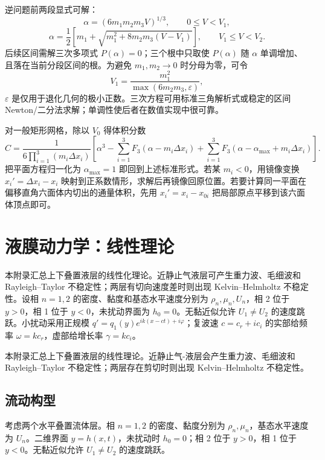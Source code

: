 \documentclass[11pt,a4paper,openany,fontset=none]{ctexbook}
\begin{document}
逆问题前两段显式可解：
\begin{equation*}
 \alpha=(6m_1m_2m_3V)^{1/3},\qquad 0\le V<V_1,
\end{equation*}
\begin{equation*}
 \alpha=\frac12\left[m_1+\sqrt{m_1^2+8m_2m_3(V-V_1)}\right],
 \qquad V_1\le V<V_2.
\end{equation*}
后续区间需解三次多项式 $P(\alpha)=0$；三个根中只取使 $P(\alpha)$ 随 $\alpha$ 单调增加、且落在当前分段区间的根。为避免 $m_1,m_2\to0$ 时分母为零，可令
\begin{equation*}
 V_1=\frac{m_1^2}{\max(6m_2m_3,\varepsilon)},
\end{equation*}
$\varepsilon$ 是仅用于退化几何的极小正数。三次方程可用标准三角解析式或稳定的区间 Newton/二分法求解；单调性使后者在数值实现中很可靠。

对一般矩形网格，除以 $V_0$ 得体积分数
\begin{equation}
 C=\frac1{6\prod_{i=1}^3(m_i\Delta x_i)}\left[
 \alpha^3-\sum_{i=1}^3F_3(\alpha-m_i\Delta x_i)
 +\sum_{i=1}^3F_3(\alpha-\alpha_{\max}+m_i\Delta x_i)
 \right]. \tag{C.4}
\end{equation}
把平面方程归一化为 $\alpha_{\max}=1$ 即回到上述标准形式。若某 $m_i<0$，用镜像变换 $x_i'=\Delta x_i-x_i$ 映射到正系数情形，求解后再镜像回原位置。若要计算同一平面在偏移直角六面体内切出的通量体积，先用 $x_i'=x_i-x_{0i}$ 把局部原点平移到该六面体顶点即可。

\chapter{液膜动力学：线性理论}
本附录汇总上下叠置液层的线性化理论。近静止气液层可产生重力波、毛细波和 Rayleigh--Taylor 不稳定性；两层有切向速度差时则出现 Kelvin--Helmholtz 不稳定性。设相 $n=1,2$ 的密度、黏度和基态水平速度分别为 $\rho_n,\mu_n,U_n$，相 2 位于 $y>0$，相 1 位于 $y<0$，未扰动界面为 $h_0=0$。无黏近似允许 $U_1\ne U_2$ 的速度跳跃。小扰动采用正规模 $q'=q_1(y)e^{ik(x-ct)+i\varphi}$；复波速 $c=c_r+ic_i$ 的实部给频率 $\omega=kc_r$，虚部给增长率 $\gamma=kc_i$。


本附录汇总上下叠置液层的线性理论。近静止气-液层会产生重力波、毛细波和 Rayleigh--Taylor 不稳定性；两层存在剪切时则出现 Kelvin--Helmholtz 不稳定性。

\section{流动构型}

考虑两个水平叠置流体层。相 $n=1,2$ 的密度、黏度分别为 $\rho_n,\mu_n$，基态水平速度为 $U_n$。二维界面 $y=h(x,t)$，未扰动时 $h_0=0$；相 2 位于 $y>0$，相 1 位于 $y<0$。无黏近似允许 $U_1\ne U_2$ 的速度跳跃。
\end{document}
